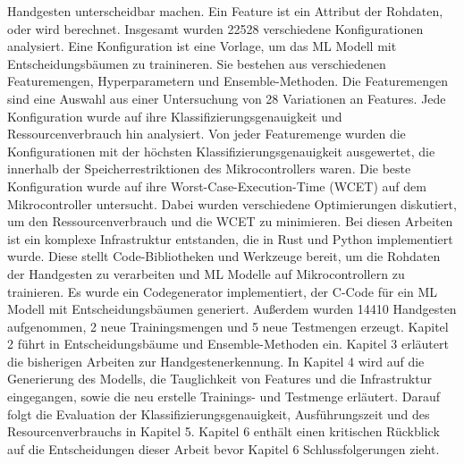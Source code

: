 Handgesten unterscheidbar machen. Ein Feature ist ein Attribut der Rohdaten, oder wird berechnet.
\newline
\newline
Insgesamt wurden 22528 verschiedene Konfigurationen analysiert. Eine Konfiguration ist eine Vorlage, um das ML Modell mit Entscheidungsbäumen zu trainineren. Sie bestehen aus verschiedenen Featuremengen,
Hyperparametern und Ensemble-Methoden. Die Featuremengen sind eine Auswahl aus einer Untersuchung von 28 Variationen an Features. Jede Konfiguration wurde auf ihre Klassifizierungsgenauigkeit und Ressourcenverbrauch
hin analysiert. Von jeder Featuremenge wurden die Konfigurationen mit der höchsten Klassifizierungsgenauigkeit ausgewertet, die innerhalb der Speicherrestriktionen des Mikrocontrollers waren. Die beste
Konfiguration wurde auf ihre Worst-Case-Execution-Time (WCET) auf dem Mikrocontroller untersucht. Dabei wurden verschiedene Optimierungen diskutiert, um den Ressourcenverbrauch und die WCET zu minimieren.
Bei diesen Arbeiten ist ein komplexe Infrastruktur entstanden, die in Rust und Python implementiert wurde. Diese stellt Code-Bibliotheken und Werkzeuge bereit, um die Rohdaten der Handgesten zu verarbeiten und
ML Modelle auf Mikrocontrollern zu trainieren. Es wurde ein Codegenerator implementiert, der C-Code für ein ML Modell mit Entscheidungsbäumen generiert. Außerdem wurden 14410 Handgesten aufgenommen,
2 neue Trainingsmengen und 5 neue Testmengen erzeugt.
\newline
\newline
Kapitel 2 führt in Entscheidungsbäume und Ensemble-Methoden ein. Kapitel 3 erläutert die bisherigen Arbeiten zur Handgestenerkennung. In Kapitel 4 wird auf die Generierung des Modells, die Tauglichkeit von
Features und die Infrastruktur eingegangen, sowie die neu erstelle Trainings- und Testmenge erläutert. Darauf folgt die Evaluation der Klassifizierungsgenauigkeit, Ausführungszeit und des Resourcenverbrauchs in
Kapitel 5. Kapitel 6 enthält einen kritischen Rückblick auf die Entscheidungen dieser Arbeit bevor Kapitel 6 Schlussfolgerungen zieht.